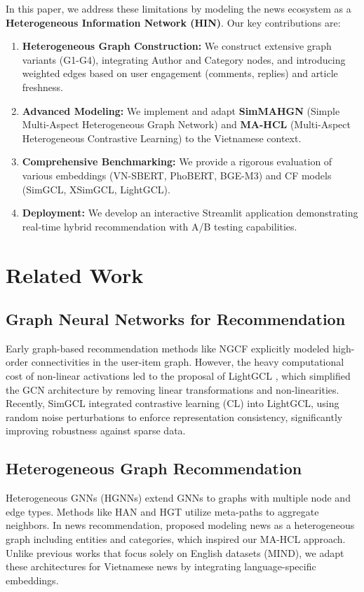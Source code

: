 \documentclass[11pt]{article}
\begin{document}
In this paper, we address these limitations by modeling the news ecosystem as a \textbf{Heterogeneous Information Network (HIN)}. Our key contributions are:
\begin{enumerate}
    \item \textbf{Heterogeneous Graph Construction:} We construct extensive graph variants (G1-G4), integrating Author and Category nodes, and introducing weighted edges based on user engagement (comments, replies) and article freshness.
    \item \textbf{Advanced Modeling:} We implement and adapt \textbf{SimMAHGN} (Simple Multi-Aspect Heterogeneous Graph Network) and \textbf{MA-HCL} (Multi-Aspect Heterogeneous Contrastive Learning) to the Vietnamese context.
    \item \textbf{Comprehensive Benchmarking:} We provide a rigorous evaluation of various embeddings (VN-SBERT, PhoBERT, BGE-M3) and CF models (SimGCL, XSimGCL, LightGCL).
    \item \textbf{Deployment:} We develop an interactive Streamlit application demonstrating real-time hybrid recommendation with A/B testing capabilities.
\end{enumerate}

\section{Related Work}

\subsection{Graph Neural Networks for Recommendation}
Early graph-based recommendation methods like NGCF \citet{wang2019neural} explicitly modeled high-order connectivities in the user-item graph. However, the heavy computational cost of non-linear activations led to the proposal of LightGCL \citet{he2020lightgcn}, which simplified the GCN architecture by removing linear transformations and non-linearities. Recently, SimGCL \citet{yu2022graph} integrated contrastive learning (CL) into LightGCL, using random noise perturbations to enforce representation consistency, significantly improving robustness against sparse data.

\subsection{Heterogeneous Graph Recommendation}
Heterogeneous GNNs (HGNNs) extend GNNs to graphs with multiple node and edge types. Methods like HAN and HGT utilize meta-paths to aggregate neighbors. In news recommendation, \citet{liu2021heterogeneous} proposed modeling news as a heterogeneous graph including entities and categories, which inspired our MA-HCL approach. Unlike previous works that focus solely on English datasets (MIND), we adapt these architectures for Vietnamese news by integrating language-specific embeddings.
\end{document}
